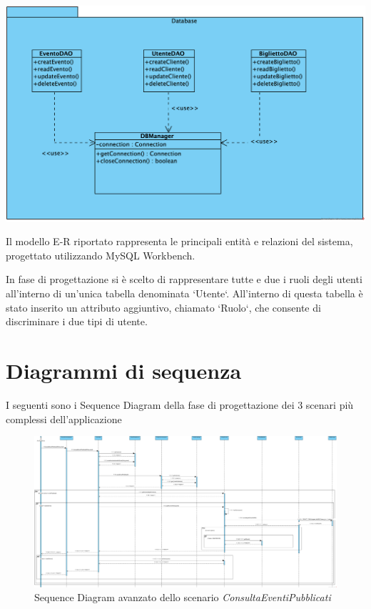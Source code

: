 \begin{center}	
	\vspace{1ex}
	\includegraphics[height=0.38\linewidth]{assets/package/database1.png}
	\vspace{1ex}
\end{center}

Il modello E-R riportato rappresenta le principali entità e relazioni del sistema, progettato utilizzando MySQL Workbench.

In fase di progettazione si è scelto di rappresentare tutte e due i ruoli degli utenti all'interno di un'unica tabella denominata `Utente`. All'interno di questa tabella è stato inserito un attributo aggiuntivo, chiamato `Ruolo`, che consente di discriminare i due tipi di utente.

\section{Diagrammi di sequenza}
I seguenti sono i Sequence Diagram della fase di progettazione dei 3 scenari più complessi dell'applicazione
\begin{figure}[h]
	\centering
	\includegraphics[width=0.7\linewidth]{assets/casid'uso/ConsultaEventiPubblicatiAvanzato}
	\caption{Sequence Diagram avanzato dello scenario \textit{ConsultaEventiPubblicati}}
\end{figure}



